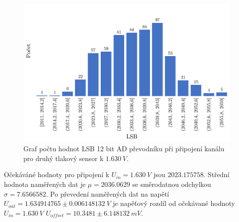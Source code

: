 \begin{figure}[H]
    \caption{Graf počtu hodnot LSB 12 bit AD převodníku při připojení kanálu pro druhý tlakový sensor k $1.630 \ V$.}
    \label{fig:hist_vacuum2_1_6}
    \includegraphics[width=1\textwidth]{graphs/vacuum2_16.png}


\end{figure}
Očekáváné hodnoty pro připojení k $U_{in} = 1.630 \ V$ jsou $2023.175758$. Střední hodnota naměřených dat je $\mu = 2036.0629$ se směrodatnou odchylkou $\sigma = 7.6566582$. Po převedení naměřených dat na napětí $U_{out} = 1.634914765 \pm 0.006148132 \ V$ je napěťový rozdíl od očekávané hodnoty $U_{in} = 1.630 \ V$
$U_{offset} = 10.3481 \pm 6.148132 \ mV$.

